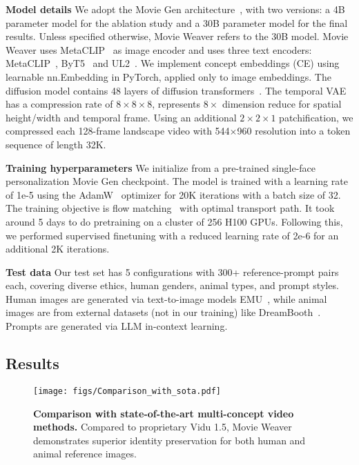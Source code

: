 \textbf{Model details}
We adopt the Movie Gen architecture~\cite{moviegen}, with two versions: a 4B parameter model for the ablation study and a 30B parameter model for the final results. 
Unless specified otherwise, Movie Weaver refers to the 30B model. 
Movie Weaver uses MetaCLIP~\cite{xu2023demystifying} as image encoder and uses three text encoders: MetaCLIP~\cite{xu2023demystifying}, ByT5~\cite{xue2022byt5} and UL2~\cite{tay2022ul2}. 
We implement concept embeddings (CE) using learnable nn.Embedding in PyTorch, applied only to image embeddings.
The diffusion model contains 48 layers of diffusion transformers~\cite{peebles2023scalable}.
The temporal VAE has a compression rate of $8\times8\times8$, represents $8\times$ dimension reduce for spatial height/width and temporal frame.
Using an additional $2\times2\times1$ patchification, we compressed each 128-frame landscape video with 544$\times$960 resolution into a token sequence of length 32K.

\textbf{Training hyperparameters}
We initialize \workname from a pre-trained single-face personalization Movie Gen checkpoint. 
The model is trained with a learning rate of 1e-5 using the AdamW~\cite{loshchilov2017decoupled} optimizer for 20K iterations with a batch size of 32.
The training objective is flow matching~\cite{lipman2022flow} with optimal transport path. 
It took around 5 days to do pretraining on a cluster of 256 H100 GPUs.
Following this, we performed supervised finetuning with a reduced learning rate of 2e-6 for an additional 2K iterations.

\textbf{Test data}
Our test set has 5 configurations with 300+ reference-prompt pairs each, covering diverse ethics, human genders, animal types, and prompt styles. Human images are generated via text-to-image models EMU~\cite{dai2023emu}, while animal images are from external datasets (not in our training) like DreamBooth~\cite{ruiz2023dreambooth}. Prompts are generated via LLM in-context learning. 


\subsection{Results}



\begin{figure*}[t]
    \centering
    \texttt{[image: figs/Comparison\_with\_sota.pdf]}
    \vspace{-0.5em}
    \caption{\textbf{Comparison with state-of-the-art multi-concept video methods.} Compared to proprietary Vidu 1.5, Movie Weaver demonstrates superior identity preservation for both human and animal reference images.}
    \label{fig:comparison_sota}
    \vspace{-1em}
\end{figure*}


